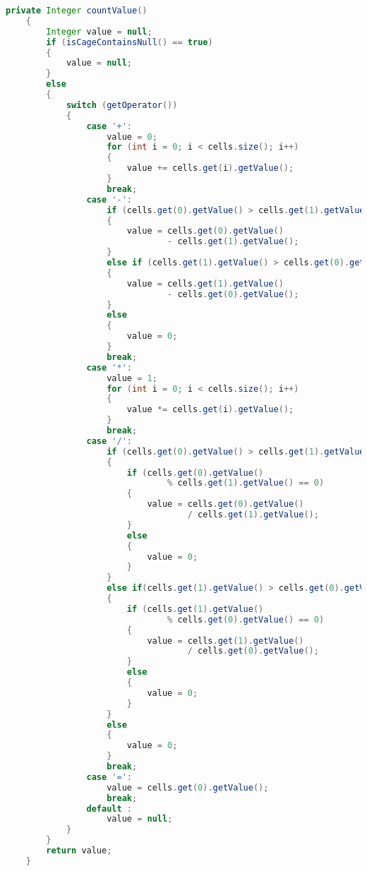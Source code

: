 \begin{lstlisting}[language=Java,basicstyle=\tiny,caption=SolverGenetic.java]
    private Integer countValue()
    {
        Integer value = null;
        if (isCageContainsNull() == true)
        {
            value = null;
        }
        else
        {
            switch (getOperator())
            {
                case '+':
                    value = 0;
                    for (int i = 0; i < cells.size(); i++)
                    {
                        value += cells.get(i).getValue();
                    }
                    break;
                case '-':
                    if (cells.get(0).getValue() > cells.get(1).getValue())
                    {
                        value = cells.get(0).getValue() 
                                - cells.get(1).getValue();
                    }
                    else if (cells.get(1).getValue() > cells.get(0).getValue())
                    {
                        value = cells.get(1).getValue() 
                                - cells.get(0).getValue();
                    }
                    else
                    {
                        value = 0;
                    }
                    break;
                case '*':
                    value = 1;
                    for (int i = 0; i < cells.size(); i++)
                    {
                        value *= cells.get(i).getValue();
                    }
                    break;
                case '/':
                    if (cells.get(0).getValue() > cells.get(1).getValue())
                    {
                        if (cells.get(0).getValue() 
                                % cells.get(1).getValue() == 0)
                        {
                            value = cells.get(0).getValue() 
                                    / cells.get(1).getValue();
                        }
                        else
                        {
                            value = 0;
                        }
                    }
                    else if(cells.get(1).getValue() > cells.get(0).getValue())
                    {
                        if (cells.get(1).getValue() 
                                % cells.get(0).getValue() == 0)
                        {
                            value = cells.get(1).getValue() 
                                    / cells.get(0).getValue();
                        }
                        else
                        {
                            value = 0;
                        }
                    }
                    else
                    {
                        value = 0;
                    }
                    break;
                case '=':
                    value = cells.get(0).getValue();
                    break;
                default :
                    value = null;
            }
        }
        return value;
    }
    

\end{lstlisting}
